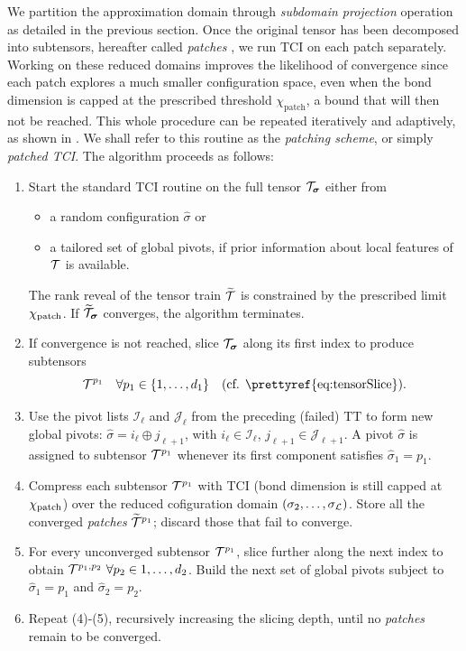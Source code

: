 We partition the approximation domain through \textit{subdomain projection} operation as detailed in the previous section. Once the original tensor has been decomposed into subtensors, hereafter called \textit{patches} \footnotemark, we run TCI on each patch separately. Working on these reduced domains improves the likelihood of convergence since each patch explores a much smaller configuration space, even when the bond dimension is capped at the prescribed threshold $\chi_{\text{patch}}$, a bound that will then not be reached.
This whole procedure can be repeated iteratively and adaptively, as shown in . We shall refer to this routine as the \textit{patching scheme}, or simply \textit{patched TCI}.
The algorithm proceeds as follows:
\begingroup
\renewcommand{\labelenumi}{(\arabic{enumi})}
\begin{enumerate}
	\item Start the standard TCI routine on the full tensor $\mathcal{T}_{\boldsymbol{\sigma}}$ either from
	\begin{itemize}
		\item a random configuration $\hat{\sigma}$ or
		\item a tailored set of global pivots, if prior information about local features of $\mathcal{T}$ is available.
	\end{itemize}
	The rank reveal of the tensor train $\widetilde{\mathcal{T}}$ is constrained by the prescribed limit $\chi_{\text{patch}}$. If $\widetilde{\mathcal{T}}_{\boldsymbol{\sigma}}$ converges, the algorithm terminates. 
	\item If convergence is not reached, slice $\mathcal{T}_{\boldsymbol{\sigma}}$ along its first index\footnotemark\; to produce subtensors 
	$$\mT^{p_1}\quad \forall p_1 \in \{1,\dots,d_1\}\quad \text{(cf. \prettyref{eq:tensorSlice}).}$$
	\item Use the pivot lists $\mathcal{I}_\ell$ and $\mathcal{J}_\ell$ from the preceding (failed) TT to form new global pivots: $\hat{\sigma} = i_\ell \oplus j_{\ell +1}$, with $i_\ell \in \mathcal{I}_\ell$, $j_{\ell+1} \in \mathcal{J}_{\ell +1}$. 
	A pivot $\hat{\sigma}$ is assigned to subtensor $\mathcal{T}^{p_1}$ whenever its first component satisfies $\hat{\sigma}_1 = p_1$.
	\item Compress each subtensor $\mathcal{T}^{p_1}$ with TCI  (bond dimension is still capped at $\chi_{\text{patch}}$) over the reduced cofiguration domain $(\sigma_2, \dots, \sigma_{\mathcal{L}})$.  Store all the converged \textit{patches} $\widetilde{\mathcal{T}}^{p_1}$; discard those that fail to converge. 
	\item For every unconverged subtensor $\mathcal{T}^{p_1}$, slice further along the next index to obtain $\mathcal{T}^{p_1, p_2}\  \forall p_2\in {1,\dots,d_2}$. Build the next set of global pivots subject to $\hat{\sigma}_1 = p_1$ and $\hat{\sigma}_2 = p_2$.
	\item Repeat (4)-(5), recursively increasing the slicing depth, until no \textit{patches} remain to be converged. 
\end{enumerate}
\endgroup
{}

